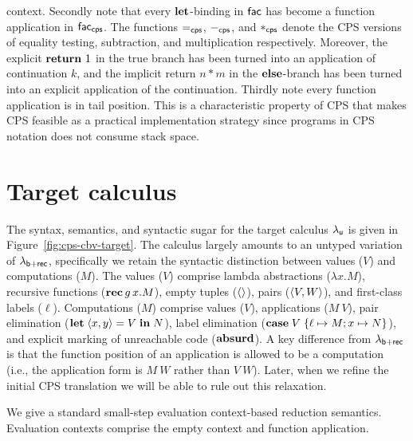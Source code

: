 \documentclass[12pt,phd,lfcs,twoside,openright,logo,leftchapter,normalheadings]{infthesis}
\theoremstyle{plain}
\theoremstyle{definition}
\begin{document}
context.%
%
Secondly note that every $\mathbf{let}$-binding in $\mathsf{fac}$ has become a
function application in $\mathsf{fac}_{\mathsf{cps}}$. The functions
$=_{\mathsf{cps}}$, $-_{\mathsf{cps}}$, and $*_{\mathsf{cps}}$ denote the CPS
versions of equality testing, subtraction, and multiplication
respectively. Moreover, the explicit $\mathbf{return}~1$ in the true branch
has been turned into an application of continuation $k$, and the
implicit return $n*m$ in the $\mathbf{else}$-branch has been turned into an
explicit application of the continuation.
%
Thirdly note every function application is in tail position. This is a
characteristic property of CPS that makes CPS feasible as a practical
implementation strategy since programs in CPS notation does not
consume stack space.


\section{Target calculus}
\label{sec:target-cps}

The syntax, semantics, and syntactic sugar for the target calculus
$\lambda_{\mathsf{u}}$ is given in Figure~\ref{fig:cps-cbv-target}. The calculus
largely amounts to an untyped variation of $\lambda_{\mathsf{b}+\mathsf{rec}}$, specifically
we retain the syntactic distinction between values ($V$) and
computations ($M$).
%
The values ($V$) comprise lambda abstractions ($\lambda x.M$),
recursive functions ($\mathbf{rec}\,g\,x.M$), empty tuples ($\langle  \rangle$),
pairs ($\langle V,W \rangle$), and first-class labels ($\ell$).
%
Computations ($M$) comprise values ($V$), applications ($M~V$), pair
elimination ($\mathbf{let}\; \langle x, y \rangle = V \;\mathbf{in}\; N$), label elimination
($\mathbf{case}\; V \;\{\ell \mapsto M; x \mapsto N\}$), and explicit marking
of unreachable code ($\mathbf{absurd}$). A key difference from $\lambda_{\mathsf{b}+\mathsf{rec}}$ is
that the function position of an application is allowed to be a
computation (i.e., the application form is $M~W$ rather than
$V~W$). Later, when we refine the initial CPS translation we will be
able to rule out this relaxation.

We give a standard small-step evaluation context-based reduction
semantics. Evaluation contexts comprise the empty context and function
application.
\end{document}
